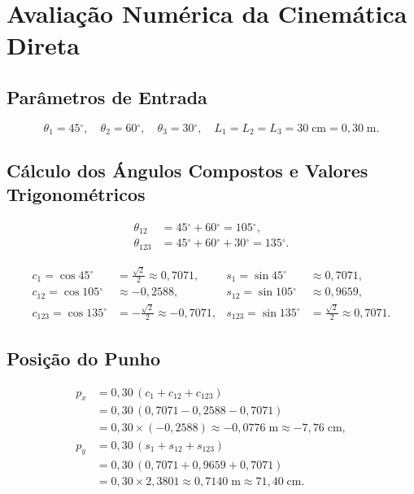 \documentclass[12pt,a4paper]{article}
\newcommand{\degr}{\ensuremath{^{\circ}}}
\begin{document}
\newpage
\section{Avalia\c{c}\~ao Num\'erica da Cinem\'atica Direta}

\subsection{Par\^ametros de Entrada}

\[
  \theta_1 = 45\degr, \quad \theta_2 = 60\degr, \quad \theta_3 = 30\degr, \quad
  L_1 = L_2 = L_3 = 30\;\text{cm} = 0{,}30\;\text{m}.
\]

\subsection{C\'alculo dos \'Angulos Compostos e Valores Trigonom\'etricos}

\begin{align*}
  \theta_{12}  &= 45\degr + 60\degr = 105\degr, \\
  \theta_{123} &= 45\degr + 60\degr + 30\degr = 135\degr.
\end{align*}

\begin{align*}
  c_1 = \cos 45\degr     &= \tfrac{\sqrt{2}}{2} \approx 0{,}7071,   & s_1 = \sin 45\degr     &\approx 0{,}7071, \\
  c_{12} = \cos 105\degr &\approx -0{,}2588,                         & s_{12} = \sin 105\degr &\approx 0{,}9659, \\
  c_{123} = \cos 135\degr &= -\tfrac{\sqrt{2}}{2} \approx -0{,}7071, & s_{123} = \sin 135\degr &= \tfrac{\sqrt{2}}{2} \approx 0{,}7071.
\end{align*}

\subsection{Posi\c{c}\~ao do Punho}

\begin{align*}
  p_x &= 0{,}30\,(c_1 + c_{12} + c_{123}) \\
      &= 0{,}30\,(0{,}7071 - 0{,}2588 - 0{,}7071) \\
      &= 0{,}30 \times (-0{,}2588) \approx -0{,}0776\;\text{m} \approx -7{,}76\;\text{cm},\\[6pt]
  p_y &= 0{,}30\,(s_1 + s_{12} + s_{123}) \\
      &= 0{,}30\,(0{,}7071 + 0{,}9659 + 0{,}7071) \\
      &= 0{,}30 \times 2{,}3801 \approx 0{,}7140\;\text{m} \approx 71{,}40\;\text{cm}.
\end{align*}
\end{document}
